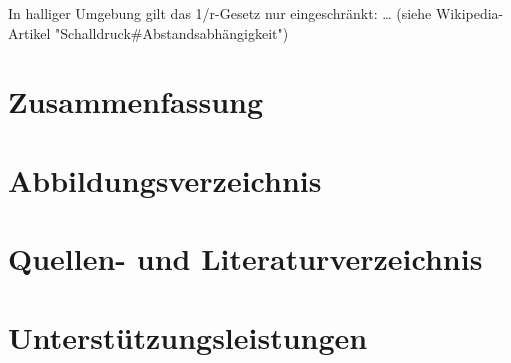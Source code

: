 \documentclass[12pt, a4paper]{article}
\begin{document}
In halliger Umgebung gilt das 1/r-Gesetz nur eingeschränkt: \dots
(siehe Wikipedia-Artikel "Schalldruck\#Abstandsabhängigkeit")

\section{Zusammenfassung}

\newpage

\section{Abbildungsverzeichnis}
\listoffigures

\section{Quellen- und Literaturverzeichnis}

\printbibliography

\section{Unterstützungsleistungen}
\end{document}

